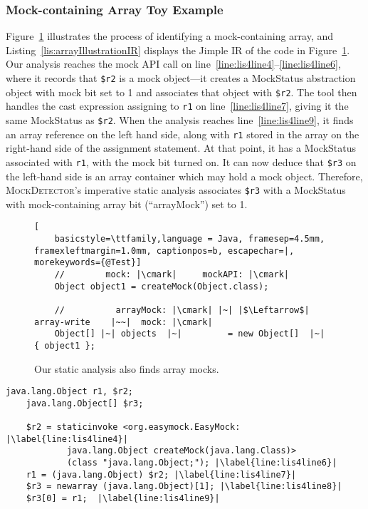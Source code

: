 \subsubsection{Mock-containing Array Toy Example}

Figure~\ref{fig:arrayMockIllustration} illustrates the process of identifying a mock-containing array, and Listing~\ref{lis:arrayIllustrationIR} displays the Jimple IR of the code in Figure~\ref{fig:arrayMockIllustration}. Our analysis reaches the mock API call on line~\ref{line:lis4line4}--\ref{line:lis4line6}, where it records that \texttt{\$r2} is a mock object---it creates a MockStatus abstraction object with mock bit set to 1 and associates that object with \texttt{\$r2}. The tool then handles the cast expression assigning to \texttt{r1} on line~\ref{line:lis4line7}, giving it the same MockStatus as \texttt{\$r2}. When the analysis reaches line~\ref{line:lis4line9}, it finds an array reference on the left hand side, along with \texttt{r1} stored in the array on the right-hand side of the assignment statement. At that point, it has a MockStatus associated with \texttt{r1}, with the mock bit turned on. It can now deduce that \texttt{\$r3} on the left-hand side is an array container which may hold a mock object. Therefore, \textsc{MockDetector}'s imperative static analysis associates \texttt{\$r3} with a MockStatus with mock-containing array bit (``arrayMock'') set to 1.

\begin{figure}
	\begin{lstlisting}[
	basicstyle=\ttfamily,language = Java, framesep=4.5mm, framexleftmargin=1.0mm, captionpos=b, escapechar=|, morekeywords={@Test}]
	//        mock: |\cmark|     mockAPI: |\cmark|
	Object object1 = createMock(Object.class);
	
	// 			arrayMock: |\cmark| |~| |$\Leftarrow$| array-write    |~~|  mock: |\cmark|
	Object[] |~| objects  |~|         = new Object[]  |~|  { object1 };
	\end{lstlisting}
	
	\caption{Our static analysis also finds array mocks.}
	\label{fig:arrayMockIllustration}
	
\end{figure}


\begin{lstlisting}[basicstyle=\ttfamily, caption={Jimple Intermediate Representation for the array in Figure~\ref{fig:arrayMockIllustration}.},
basicstyle=\ttfamily, framesep=4.5mm, framexleftmargin=1.0mm, captionpos=b, label=lis:arrayIllustrationIR, escapechar=|, morekeywords={@Test, specialinvoke, virtualinvoke, staticinvoke, newarray}]
	java.lang.Object r1, $r2;
	java.lang.Object[] $r3;
	
	$r2 = staticinvoke <org.easymock.EasyMock: |\label{line:lis4line4}|
			java.lang.Object createMock(java.lang.Class)>
			(class "java.lang.Object;"); |\label{line:lis4line6}|
	r1 = (java.lang.Object) $r2; |\label{line:lis4line7}|
	$r3 = newarray (java.lang.Object)[1]; |\label{line:lis4line8}|
	$r3[0] = r1;  |\label{line:lis4line9}|
\end{lstlisting}

